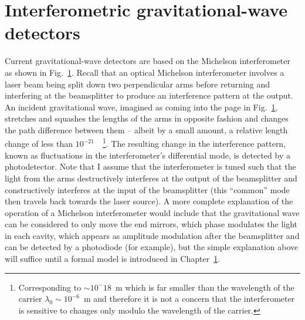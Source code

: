 \section{Interferometric gravitational-wave detectors}

Current gravitational-wave detectors are based on the Michelson interferometer as shown in Fig.~\ref{}. Recall that an optical Michelson interferometer involves a laser beam being split down two perpendicular arms before returning and interfering at the beamsplitter to produce an interference pattern at the output. 
An incident gravitational wave, imagined as coming into the page in Fig.~\ref{}, stretches and squashes the lengths of the arms in opposite fashion and changes the path difference between them -- albeit by a small amount, a relative length change of less than $10^{-21}$~\cite{}~\footnote{Corresponding to $\sim10^-{18}$~m which is far smaller than the wavelength of the carrier $\lambda_0\sim10^{-6}$~m and therefore it is not a concern that the interferometer is sensitive to changes only modulo the wavelength of the carrier.}. The resulting change in the interference pattern, known as fluctuations in the interferometer's differential mode, is detected by a photodetector. Note that I assume that the interferometer is tuned such that the light from the arms destructively interferes at the output of the beamsplitter and constructively interferes at the input of the beamsplitter (this ``common'' mode then travels back towards the laser source).
A more complete explanation of the operation of a Michelson interferometer would include that the gravitational wave can be considered to only move the end mirrors, which phase modulates the light in each cavity, which appears as amplitude modulation after the beamsplitter and can be detected by a photodiode (for example), but the simple explanation above will suffice until a formal model is introduced in Chapter~\ref{}.  


